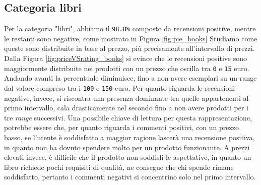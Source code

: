 		\subsection{Categoria libri}
			Per la categoria "libri", abbiamo il \verb|98.8%| composto da recensioni positive, mentre le restanti sono negative, come mostrato in Figura \ref{fig:pie_books}
			Studiamo come queste sono distribuite in base al prezzo, più precisamente all'intervallo di prezzi. \\
			Dalla Figura \ref{fig:priceVSrating_books} si evince che le recensioni positive sono maggiormente distribuite nei prodotti con un prezzo che oscilla tra \verb|0| e \verb|15| euro. Andando avanti la percentuale diminuisce, fino a non avere esemplari su un range dal valore compreso tra i \verb|100| e \verb|150| euro. Per quanto riguarda le recensioni negative, invece, si riscontra una presenza dominante tra quelle appartenenti al primo intervallo, cala drasticamente nel secondo fino a non avere prodotti per i tre \textit{range} successivi. Una possibile chiave di lettura per questa rappresentazione, potrebbe essere che, per quanto riguarda i commenti positivi, con un prezzo basso, se l'utente è soddisfatto a maggior ragione lascerà una recensione positiva, in quanto non ha dovuto spendere molto per un prodotto funzionante. A prezzi elevati invece, è difficile che il prodotto non soddisfi le aspettative, in quanto un libro richiede pochi requisiti di qualità, ne consegue che chi spende rimane soddisfatto, pertanto i commenti negativi si concentrino solo nel primo intervallo.
				
